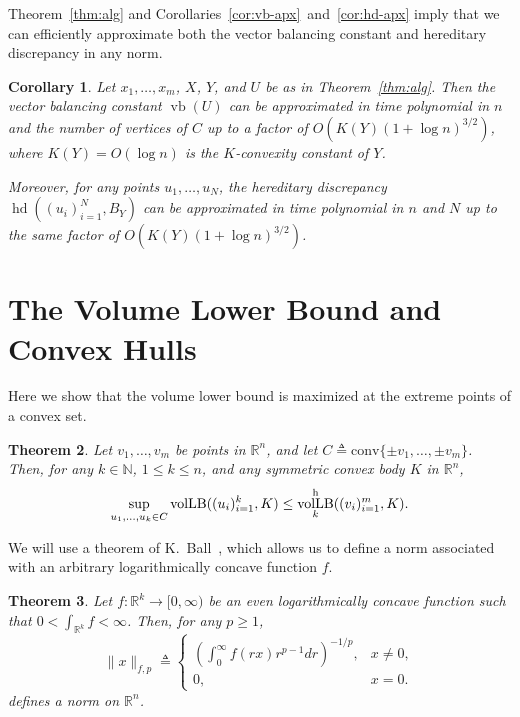 \documentclass[11pt]{article}
\newtheorem{theorem}{Theorem}
\newtheorem{corollary}[theorem]{Corollary}
\newcommand{\R}{{\mathbb{R}}}
\newcommand{\eqdef}{\triangleq}
\DeclareMathOperator{\vollb}{volLB}
\DeclareMathOperator{\hd}{hd}
\DeclareMathOperator{\vb}{vb}
\begin{document}
Theorem~\ref{thm:alg} and
Corollaries~\ref{cor:vb-apx}~and~\ref{cor:hd-apx} imply that we can efficiently
approximate both the vector balancing constant and hereditary
discrepancy in any norm.

\begin{corollary}
  Let $x_1, \ldots, x_m$, $X$, $Y$, and $U$ be as in
  Theorem~\ref{thm:alg}.  Then the vector
  balancing constant $\vb(U)$ can be approximated in time
  polynomial in $n$ and the number of vertices of $C$ up to a factor
  of $O(K(Y)(1 + \log n)^{3/2})$, where $K(Y) = O(\log n)$ is the
  $K$-convexity constant of $Y$.

  Moreover, for any points $u_1, \ldots, u_N$, the hereditary
  discrepancy $\hd((u_i)_{i = 1}^N, B_Y)$ can be approximated in time
  polynomial in $n$ and $N$ up to the same factor of  $O(K(Y)(1 + \log
  n)^{3/2})$. 
\end{corollary}


\section{The Volume Lower Bound and Convex Hulls}
\label{sec:conv-hulls}

Here we show that the volume lower bound is maximized at the extreme
points of a convex set.

\begin{theorem}\label{thm:conv-hull}
  Let $v_1, \ldots, v_m$ be points in $\R^n$, and let $C \eqdef
  \mathrm{conv}\{\pm v_1, \ldots, \pm v_m\}$. Then, for any $k \in
  \mathbb{N}$, $1 \le k \le n$, and any symmetric convex body $K$ in
  $\R^n$,
  \[
  \sup_{u_1, \ldots, u_k \in C}\vollb((u_i)_{i = 1}^k, K)
  \le
  \vollb^{\rm h}_k((v_i)_{i = 1}^m, K).
  \]
\end{theorem}

We will use a theorem of K.~Ball~\cite{Ball88}, which allows us to
define a norm associated with an arbitrary logarithmically concave
function $f$.
\begin{theorem}\label{thm:ball-logconcave}
  Let $f: \R^k \to [0, \infty)$ be an even logarithmically concave
  function such that $0 < \int_{\R^k} f < \infty$. Then, for any $p
  \ge 1$, 
  \[
  \|x\|_{f,p} \eqdef 
  \begin{cases}
    \left(\int_0^\infty f(rx) r^{p-1}dr\right)^{-1/p}, &x \neq 0,\\
    0, &x = 0.
  \end{cases}
  \]
  defines a norm on $\R^n$. 
\end{theorem}
\end{document}
